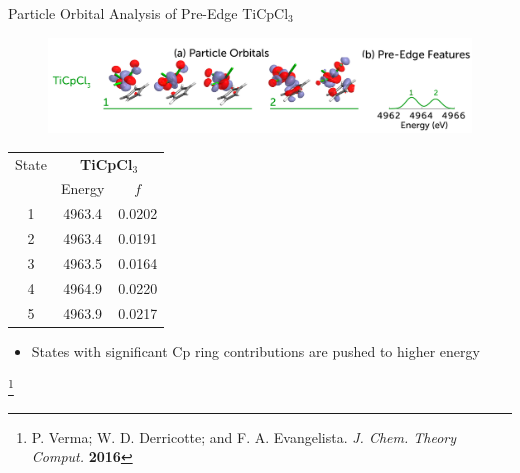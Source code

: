 \documentclass[t]{beamer}
\newcommand\blfootnote[1]{%
  \begingroup
  \renewcommand\thefootnote{}\footnote{#1}%
  \addtocounter{footnote}{-1}%
  \endgroup
}
\begin{document}
\begin{frame}{Particle Orbital Analysis of Pre-Edge TiCpCl$_3$}
 \begin{figure}
\includegraphics[scale=0.15]{ticpcl3_preedge.png}
\end{figure}
\begin{table}
\footnotesize
\begin{tabular}{c@{\hskip 1in}c@{\hskip 1in}c}
\toprule
State &   \multicolumn{2}{c}{\textbf{TiCpCl$_3$}}   \\
& Energy & $f$ \\
\cmidrule(r){2-3}
1 & 4963.4 & 0.0202\\
2 & 4963.4 & 0.0191\\
3 & 4963.5 & 0.0164\\
4 & 4964.9 & 0.0220\\
5 & 4963.9 & 0.0217\\
\bottomrule
\end{tabular}
\end{table}
\begin{itemize}
\item States with significant Cp ring contributions are pushed to higher energy
\end{itemize}
\blfootnote{P. Verma; W. D. Derricotte; and F. A. Evangelista. \textit{J. Chem. Theory Comput.} \textbf{2016}}
\end{frame}
\end{document}
